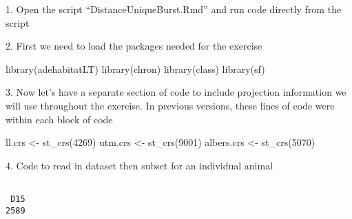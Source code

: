 \documentclass[
  letterpaper,
]{book}
\newenvironment{Shaded}{\begin{snugshade}}{\end{snugshade}}
\newcommand{\AttributeTok}[1]{\textcolor[rgb]{0.40,0.45,0.13}{#1}}
\newcommand{\CommentTok}[1]{\textcolor[rgb]{0.37,0.37,0.37}{#1}}
\newcommand{\DecValTok}[1]{\textcolor[rgb]{0.68,0.00,0.00}{#1}}
\newcommand{\FunctionTok}[1]{\textcolor[rgb]{0.28,0.35,0.67}{#1}}
\newcommand{\NormalTok}[1]{\textcolor[rgb]{0.00,0.23,0.31}{#1}}
\newcommand{\OtherTok}[1]{\textcolor[rgb]{0.00,0.23,0.31}{#1}}
\newcommand{\SpecialCharTok}[1]{\textcolor[rgb]{0.37,0.37,0.37}{#1}}
\newcommand{\StringTok}[1]{\textcolor[rgb]{0.13,0.47,0.30}{#1}}
\begin{document}
1. Open the script ``DistanceUniqueBurst.Rmd'' and run code directly
from the script

2. First we need to load the packages needed for the exercise

\begin{Shaded}
\begin{Highlighting}[]
\FunctionTok{library}\NormalTok{(adehabitatLT)}
\FunctionTok{library}\NormalTok{(chron)}
\FunctionTok{library}\NormalTok{(class)}
\FunctionTok{library}\NormalTok{(sf)}
\end{Highlighting}
\end{Shaded}

3. Now let's have a separate section of code to include projection
information we will use throughout the exercise. In previous versions,
these lines of code were within each block of code

\begin{Shaded}
\begin{Highlighting}[]
\NormalTok{ll.crs }\OtherTok{\textless{}{-}} \FunctionTok{st\_crs}\NormalTok{(}\DecValTok{4269}\NormalTok{)}
\NormalTok{utm.crs }\OtherTok{\textless{}{-}} \FunctionTok{st\_crs}\NormalTok{(}\DecValTok{9001}\NormalTok{)}
\NormalTok{albers.crs }\OtherTok{\textless{}{-}} \FunctionTok{st\_crs}\NormalTok{(}\DecValTok{5070}\NormalTok{)}
\end{Highlighting}
\end{Shaded}

4. Code to read in dataset then subset for an individual animal

\begin{Shaded}
\end{Shaded}

\begin{verbatim}

 D15 
2589 
\end{verbatim}

\begin{Shaded}
\end{Shaded}
\end{document}
